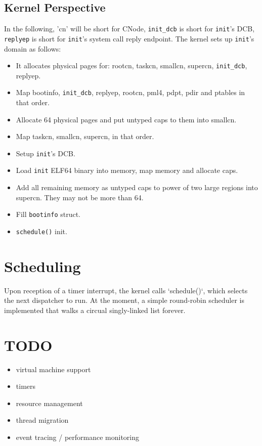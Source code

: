 \documentclass{scrreprt}
\begin{document}
  \subsection{Kernel Perspective}

  In the following, 'cn' will be short for CNode, \lstinline+init_dcb+ is short
  for \lstinline+init+'s DCB, \lstinline+replyep+ is short for \lstinline+init+'s system call reply
  endpoint. The kernel sets up \lstinline+init+'s domain as follows:

  \begin{itemize}
  \item It allocates physical pages for: rootcn, taskcn, smallcn,
    supercn, \lstinline+init_dcb+, replyep.
  \item Map bootinfo, \lstinline+init_dcb+, replyep, rootcn, pml4, pdpt, pdir and
    ptables in that order.
  \item Allocate 64 physical pages and put untyped caps to them into
    smallcn.
  \item Map taskcn, smallcn, supercn, in that order.
  \item Setup \lstinline+init+'s DCB.
  \item Load \lstinline+init+ ELF64 binary into memory, map memory and allocate
    caps.
  \item Add all remaining memory as untyped caps to power of two large
    regions into supercn. They may not be more than 64.
  \item Fill \lstinline+bootinfo+ struct.
  \item \lstinline+schedule()+ init.
  \end{itemize}

  \section{Scheduling}

  Upon reception of a timer interrupt, the kernel calls `schedule()`,
  which selects the next dispatcher to run. At the moment, a simple
  round-robin scheduler is implemented that walks a circual
  singly-linked list forever.

  \section{TODO}

  \begin{itemize}
  \item virtual machine support
  \item timers
  \item resource management
  \item thread migration
  \item event tracing / performance monitoring
  \end{itemize}
\end{document}
